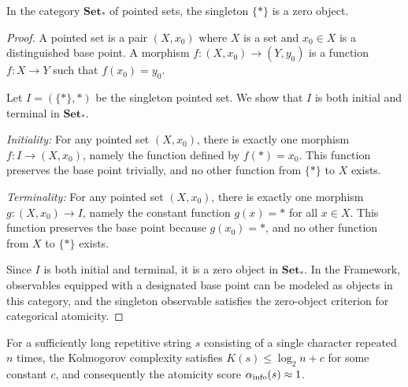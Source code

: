 \begin{proposition}\label{prop:cat-atom}
In the category $\mathbf{Set}_*$ of pointed sets, the singleton $\{*\}$ is a zero object.
\end{proposition}

\begin{proof}
A pointed set is a pair $(X, x_0)$ where $X$ is a set and $x_0 \in X$ is a distinguished base point. A morphism $f: (X, x_0) \to (Y, y_0)$ is a function $f: X \to Y$ such that $f(x_0) = y_0$.

Let $I = (\{*\}, *)$ be the singleton pointed set. We show that $I$ is both initial and terminal in $\mathbf{Set}_*$.

\textit{Initiality:} For any pointed set $(X, x_0)$, there is exactly one morphism $f: I \to (X, x_0)$, namely the function defined by $f(*) = x_0$. This function preserves the base point trivially, and no other function from $\{*\}$ to $X$ exists.

\textit{Terminality:} For any pointed set $(X, x_0)$, there is exactly one morphism $g: (X, x_0) \to I$, namely the constant function $g(x) = *$ for all $x \in X$. This function preserves the base point because $g(x_0) = *$, and no other function from $X$ to $\{*\}$ exists.

Since $I$ is both initial and terminal, it is a zero object in $\mathbf{Set}_*$. In the \Apeiron{} Framework, observables equipped with a designated base point can be modeled as objects in this category, and the singleton observable satisfies the zero-object criterion for categorical atomicity.
\end{proof}

\begin{proposition}\label{prop:info-atom}
For a sufficiently long repetitive string $s$ consisting of a single character repeated $n$ times, the Kolmogorov complexity satisfies $K(s) \le \log_2 n + c$ for some constant $c$, and consequently the atomicity score $\alpha_{\text{info}}(s) \approx 1$.
\end{proposition}


